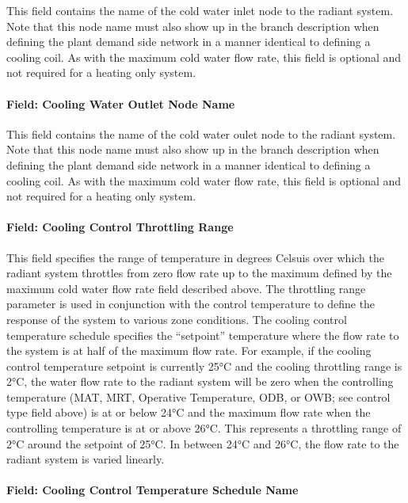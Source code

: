 This field contains the name of the cold water inlet node to the radiant system. Note that this node name must also show up in the branch description when defining the plant demand side network in a manner identical to defining a cooling coil. As with the maximum cold water flow rate, this field is optional and not required for a heating only system.

\paragraph{Field: Cooling Water Outlet Node Name}\label{field-cooling-water-outlet-node-name-000}

This field contains the name of the cold water oulet node to the radiant system. Note that this node name must also show up in the branch description when defining the plant demand side network in a manner identical to defining a cooling coil. As with the maximum cold water flow rate, this field is optional and not required for a heating only system.

\paragraph{Field: Cooling Control Throttling Range}\label{field-cooling-control-throttling-range}

This field specifies the range of temperature in degrees Celsuis over which the radiant system throttles from zero flow rate up to the maximum defined by the maximum cold water flow rate field described above. The throttling range parameter is used in conjunction with the control temperature to define the response of the system to various zone conditions. The cooling control temperature schedule specifies the ``setpoint'' temperature where the flow rate to the system is at half of the maximum flow rate. For example, if the cooling control temperature setpoint is currently 25°C and the cooling throttling range is 2°C, the water flow rate to the radiant system will be zero when the controlling temperature (MAT, MRT, Operative Temperature, ODB, or OWB; see control type field above) is at or below 24°C and the maximum flow rate when the controlling temperature is at or above 26°C. This represents a throttling range of 2°C around the setpoint of 25°C. In between 24°C and 26°C, the flow rate to the radiant system is varied linearly.

\paragraph{Field: Cooling Control Temperature Schedule Name}\label{field-cooling-control-temperature-schedule-name}

